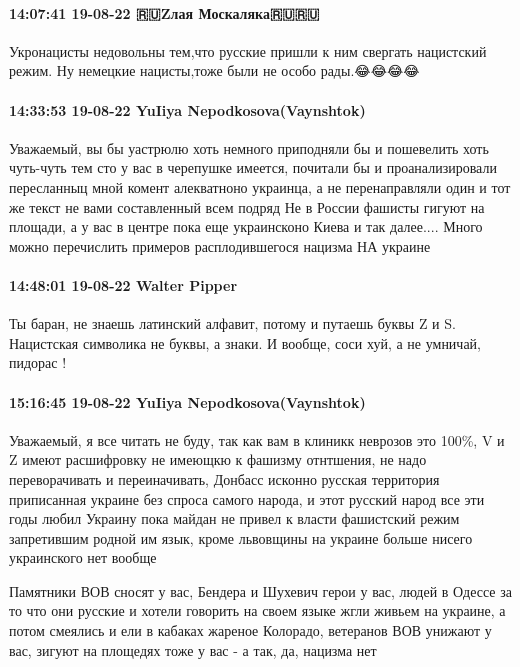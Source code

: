 \paragraph{14:07:41 19-08-22 🇷🇺Zлая Москаляка🇷🇺🇷🇺}

Укронацисты недовольны тем,что русские пришли к ним свергать нацистский режим.
Ну немецкие нацисты,тоже были не особо рады.😂😂😂😂

\paragraph{14:33:53 19-08-22 YuIiya Nepodkosova(Vaynshtok)}

Уважаемый, вы бы уастрюлю хоть немного приподняли бы и пошевелить хоть чуть-чуть тем сто у вас в черепушке имеется, почитали бы и проанализировали пересланныц мной комент алекватноно украинца, а не перенаправляли один и тот же текст не вами составленный всем подряд
Не в России фашисты гигуют на площади, а у вас в центре пока еще украинсконо Киева и так далее.... Много можно перечислить примеров расплодившегося нацизма НА украине

\paragraph{14:48:01 19-08-22 Walter Pipper}

Ты баран, не знаешь латинский алфавит, потому и путаешь буквы Z и S. Нацистская
символика не буквы, а знаки. И вообще, соси хуй, а не умничай, пидорас !

\paragraph{15:16:45 19-08-22 YuIiya Nepodkosova(Vaynshtok)}

Уважаемый, я все читать не буду, так как вам в клиникк неврозов это 100\%, V и Z
имеют расшифровку не имеющкю к фашизму отнтшения, не надо переворачивать и
переиначивать, Донбасс исконно русская территория приписанная украине без
спроса самого народа, и этот русский народ все эти годы любил Украину пока
майдан не привел к власти фашистский режим запретившим родной им язык, кроме
львовщины на украине больше нисего украинского нет вообще

Памятники ВОВ сносят у вас, Бендера и Шухевич герои у вас, людей в Одессе за то
что они русские и хотели говорить на своем языке жгли живьем на украине, а
потом смеялись и ели в кабаках жареное Колорадо, ветеранов ВОВ унижают у вас,
зигуют на площедях тоже у вас - а так, да, нацизма нет

